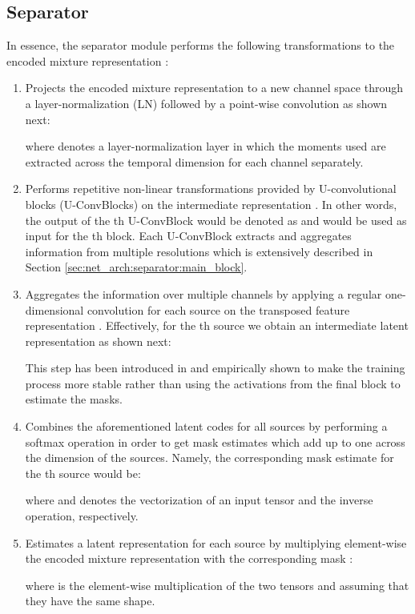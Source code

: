 \documentclass{article}
\theoremstyle{definition}
\begin{document}
\subsection{Separator}
\label{sec:net_arch:separator}
In essence, the separator  module performs the following transformations to the encoded mixture representation :
\begin{enumerate}
    \item Projects the encoded mixture representation  to a new channel space through a layer-normalization (LN) \cite{ba2016layernormalization} followed by a point-wise convolution as shown next:
    
    where  denotes a layer-normalization layer in which the moments used are extracted across the temporal dimension for each channel separately.
    \item Performs repetitive non-linear transformations provided by  U-convolutional blocks (U-ConvBlocks) on the intermediate representation . In other words, the output of the th U-ConvBlock would be denoted as  and would be used as input for the th block. Each U-ConvBlock extracts and aggregates information from multiple resolutions which is extensively described in Section \ref{sec:net_arch:separator:main_block}.  
    \item Aggregates the information over multiple channels by applying a regular one-dimensional convolution for each source on the transposed feature representation . Effectively, for the th source we obtain an intermediate latent representation as shown next:
    
    
    This step has been introduced in \cite{tzinis2019two} and empirically shown to make the training process more stable rather than using the activations from the final block  to estimate the masks.
    \item Combines the aforementioned latent codes for all sources  by performing a softmax operation in order to get mask estimates  which add up to one across the dimension of the sources. Namely, the corresponding mask estimate for the th source would be:
    
    where  and  denotes the vectorization of an input tensor and the inverse operation, respectively. 
    \item Estimates a latent representation  for each source by multiplying element-wise the encoded mixture representation  with the corresponding mask :
    
    where  is the element-wise multiplication of the two tensors  and  assuming that they have the same shape. 
\end{enumerate}
\end{document}
